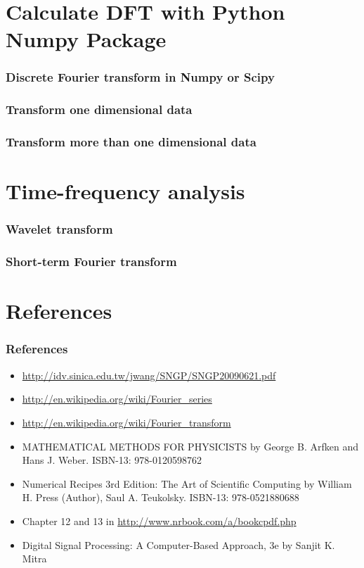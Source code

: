 \documentclass{beamer}
\begin{document}
\section{Calculate DFT with Python Numpy Package}
\begin{frame}
\frametitle{Discrete Fourier transform in Numpy or Scipy}
\end{frame}
\begin{frame}
\frametitle{Transform one dimensional data}
\end{frame}
\begin{frame}
\frametitle{Transform more than one dimensional data}
\end{frame}
\section{Time-frequency analysis}
\begin{frame}
\frametitle{Wavelet transform}
\end{frame}
\begin{frame}
\frametitle{Short-term Fourier transform}
\end{frame}
\section{References}
\begin{frame}
\frametitle{References}
\begin{itemize}
\item \url{http://idv.sinica.edu.tw/jwang/SNGP/SNGP20090621.pdf}
\item \url{http://en.wikipedia.org/wiki/Fourier_series}
\item \url{http://en.wikipedia.org/wiki/Fourier_transform}
\item MATHEMATICAL METHODS FOR PHYSICISTS by George B. Arfken and Hans J. Weber. ISBN-13: 978-0120598762
\item Numerical Recipes 3rd Edition: The Art of Scientific Computing by William H. Press  (Author), Saul A. Teukolsky. ISBN-13: 978-0521880688
\item Chapter 12 and 13 in \url{http://www.nrbook.com/a/bookcpdf.php}
\item Digital Signal Processing: A Computer-Based Approach, 3e by Sanjit K. Mitra
\end{itemize}
\end{frame}
\end{document}

